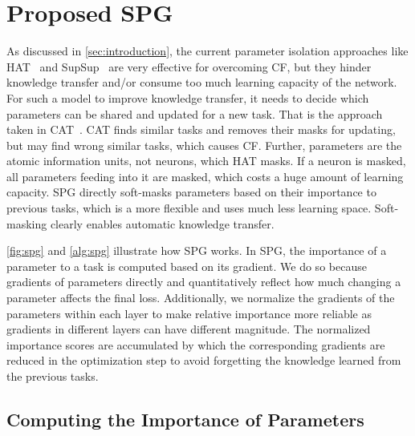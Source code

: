 \section{Proposed SPG} 



As discussed in \cref{sec:introduction}, the current parameter isolation approaches like HAT~\citep{hat} and SupSup~\citep{supsup} are very effective for overcoming CF, but they hinder knowledge transfer and/or consume too much learning capacity of the network.
For such a model to improve knowledge transfer, it needs to decide which parameters can be shared and updated for a new task. That is the approach taken in CAT~\citep{cat}. CAT  finds similar tasks and removes their masks for updating, but may find wrong similar tasks, which causes CF.
Further, parameters are the atomic information units, not neurons, which HAT masks. If a neuron is masked, all parameters feeding into it are masked, which costs a huge amount of learning capacity. 
SPG directly soft-masks parameters based on their importance to previous tasks, which is a more flexible and uses much less learning space. 
Soft-masking clearly enables automatic knowledge transfer. 





\cref{fig:spg} and \cref{alg:spg} illustrate how SPG works.
In SPG, the importance of a parameter to a task is computed based on its gradient. We do so because gradients of parameters directly and quantitatively reflect how much changing a parameter affects the final loss.
Additionally, we normalize the gradients of the parameters within each layer to make relative importance more reliable as gradients in different layers can have different magnitude.
The normalized importance scores are accumulated by which the corresponding gradients are reduced in the optimization step to avoid forgetting the knowledge learned from the previous tasks.










\subsection{Computing the Importance of Parameters} \label{sec:computing_gradients}


